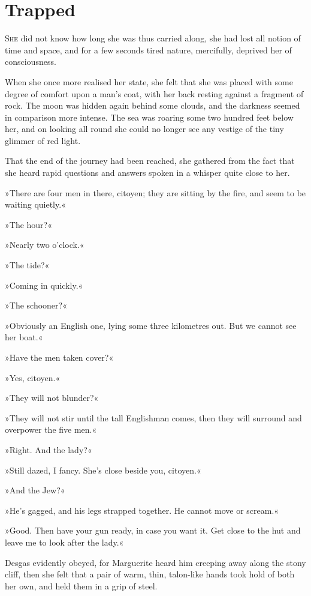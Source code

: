 
\chapter{Trapped}
\lettrine[lines=4]{S}{he} did not know how long she was thus carried along, she had lost all notion of time and space, and for a few seconds tired nature, mercifully, deprived her of consciousness.

When she once more realised her state, she felt that she was placed with some degree of comfort upon a man's coat, with her back resting against a fragment of rock. The moon was hidden again behind some clouds, and the darkness seemed in comparison more intense. The sea was roaring some two hundred feet below her, and on looking all round she could no longer see any vestige of the tiny glimmer of red light.

That the end of the journey had been reached, she gathered from the fact that she heard rapid questions and answers spoken in a whisper quite close to her.

»There are four men in there, citoyen; they are sitting by the fire, and seem to be waiting quietly.«

»The hour?«

»Nearly two o'clock.«

»The tide?«

»Coming in quickly.«

»The schooner?«

»Obviously an English one, lying some three kilometres out. But we cannot see her boat.«

»Have the men taken cover?«

»Yes, citoyen.«

»They will not blunder?«

»They will not stir until the tall Englishman comes, then they will surround and overpower the five men.«

»Right. And the lady?«

»Still dazed, I fancy. She's close beside you, citoyen.«

»And the Jew?«

»He's gagged, and his legs strapped together. He cannot move or scream.«

»Good. Then have your gun ready, in case you want it. Get close to the hut and leave me to look after the lady.«

Desgas evidently obeyed, for Marguerite heard him creeping away along the stony cliff, then she felt that a pair of warm, thin, talon-like hands took hold of both her own, and held them in a grip of steel.

